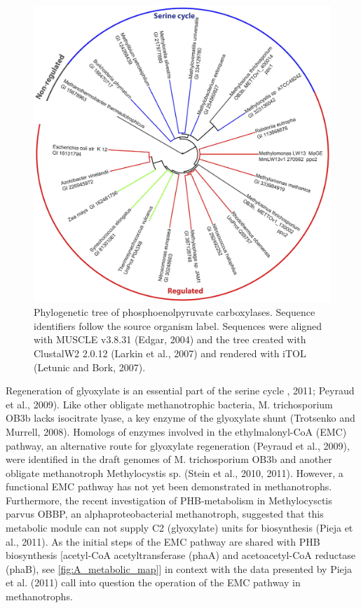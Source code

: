 \begin{figure}[H]
\centering
     \includegraphics[width=1.0\textwidth]{./tex/chapter1/figures/figure3.png}
     \begin{singlespace}
     \caption{Phylogenetic tree of phosphoenolpyruvate carboxylases.
        Sequence identifiers follow the source organism label. Sequences were aligned with MUSCLE v3.8.31 (Edgar, 2004) and
        the tree created with ClustalW2 2.0.12 (Larkin et al., 2007) and rendered with iTOL (Letunic and Bork, 2007).}
     \end{singlespace}
     \label{fig:B_pep}
\end{figure}

Regeneration of glyoxylate is an essential part of the serine cycle \cite{anthony1982}, 2011; Peyraud et al., 2009).
Like other obligate methanotrophic bacteria, M. trichosporium OB3b lacks isocitrate lyase, a key enzyme of the glyoxylate shunt (Trotsenko and Murrell, 2008).
Homologs of enzymes involved in the ethylmalonyl-CoA (EMC) pathway, an alternative route for glyoxylate regeneration (Peyraud et al., 2009), were identified in the draft genomes of M. trichosporium OB3b and another obligate methanotroph Methylocystis sp. (Stein et al., 2010, 2011).
However, a functional EMC pathway has not yet been demonstrated in methanotrophs.
Furthermore, the recent investigation of PHB-metabolism in Methylocysctis parvus OBBP, an alphaproteobacterial methanotroph, suggested that this metabolic module can not supply C2 (glyoxylate) units for biosynthesis (Pieja et al., 2011).
As the initial steps of the EMC pathway are shared with PHB biosynthesis [acetyl-CoA acetyltransferase (phaA) and acetoacetyl-CoA reductase (phaB), see \ref{fig:A_metabolic_map}] in context with the data presented by Pieja et al. (2011) call into question the operation of the EMC pathway in methanotrophs.

